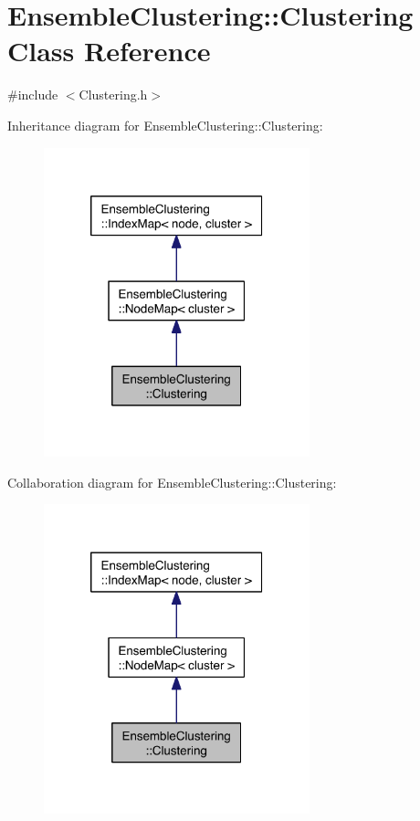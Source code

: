 \hypertarget{class_ensemble_clustering_1_1_clustering}{\section{Ensemble\-Clustering\-:\-:Clustering Class Reference}
\label{class_ensemble_clustering_1_1_clustering}
}


{\ttfamily \#include $<$Clustering.\-h$>$}



Inheritance diagram for Ensemble\-Clustering\-:\-:Clustering\-:
\nopagebreak
\begin{figure}[H]
\begin{center}
\leavevmode
\includegraphics[width=218pt]{class_ensemble_clustering_1_1_clustering__inherit__graph}
\end{center}
\end{figure}


Collaboration diagram for Ensemble\-Clustering\-:\-:Clustering\-:
\nopagebreak
\begin{figure}[H]
\begin{center}
\leavevmode
\includegraphics[width=218pt]{class_ensemble_clustering_1_1_clustering__coll__graph}
\end{center}
\end{figure}
